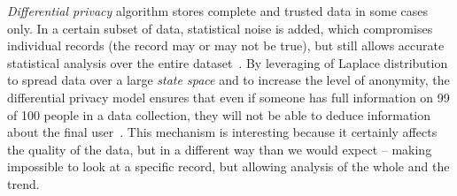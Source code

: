 \textit{Differential privacy} algorithm stores complete and trusted data in some cases only.
In a certain subset of data, statistical noise is added, which compromises individual records (the record may or may not be true), but still allows accurate statistical analysis over the entire dataset~\cite{difpriv2016}.
By leveraging of Laplace distribution to spread data over a large \textit{state space} and to increase the level of anonymity, the differential privacy model ensures that even if someone has full information on 99 of 100 people in a data collection, they will not be able to deduce information about the final user~\cite{web:differential-privacy,dwork2014}.
This mechanism is interesting because it certainly affects the quality of the data, but in a different way than we would expect – making impossible to look at a specific record, but allowing analysis of the whole and the trend.












